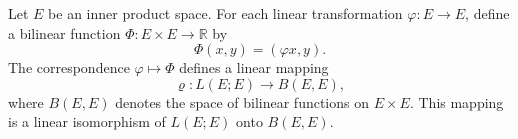 Let $E$ be an inner product space. For each linear transformation $\varphi: E \rightarrow E$, define a bilinear function $\Phi: E \times E \rightarrow \mathbb{R}$ by
$$\Phi(x, y) = (\varphi x, y).$$
The correspondence $\varphi \mapsto \Phi$ defines a linear mapping
$$\varrho: L(E; E) \rightarrow B(E, E),$$
where $B(E, E)$ denotes the space of bilinear functions on $E \times E$. This mapping is a linear isomorphism of $L(E; E)$ onto $B(E, E)$.
